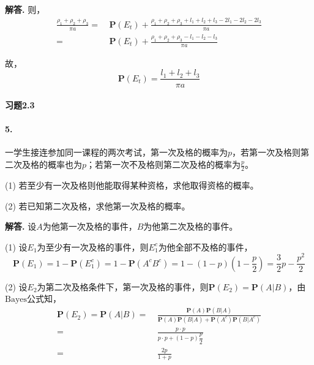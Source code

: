 \documentclass[12pt, a4paper, oneside]{ctexart}
\newenvironment{solution}{\par\noindent\textbf{解答. }}{\bigskip\par}
\begin{document}
\begin{solution}
    则，
    \begin{equation*}
        \begin{aligned}
            \frac{\rho_1+\rho_2+\rho_3}{\pi a} =&\ \textbf{P}(E_t)+\frac{\rho_1+\rho_2+\rho_3+l_1+l_2+l_3-2l_1-2l_2-2l_3}{\pi a}\\
            =&\ \textbf{P}(E_t)+\frac{\rho_1+\rho_2+\rho_3-l_1-l_2-l_3}{\pi a}
        \end{aligned}
    \end{equation*}

    故，
    \begin{equation*}
        \textbf{P}(E_t) = \frac{l_1+l_2+l_3}{\pi a}
    \end{equation*}
\end{solution}
\paragraph{习题2.3}
\paragraph{5.}一学生接连参加同一课程的两次考试，第一次及格的概率为$p$，若第一次及格则第二次及格的概率也为$p$；若第一次不及格则第二次及格的概率为$\frac{p}{2}$。

(1) 若至少有一次及格则他能取得某种资格，求他取得资格的概率。

(2) 若已知第二次及格，求他第一次及格的概率。

\begin{solution}
    设$A$为他第一次及格的事件，$B$为他第二次及格的事件。

    (1) 设$E_1$为至少有一次及格的事件，则$E_1^c$为他全部不及格的事件，
    \begin{equation*}
        \textbf{P}(E_1) = 1-\textbf{P}(E_1^c) = 1-\textbf{P}(A^cB^c) = 1-(1-p)(1-\frac{p}{2}) = \frac{3}{2}p-\frac{p^2}{2}
    \end{equation*}

    (2) 设$E_2$为第二次及格条件下，第一次及格的事件，则$\textbf{P}(E_2) = \textbf{P}(A|B)$，由$\text{Bayes公式}$知，
    \begin{equation*}
        \begin{aligned}
            \textbf{P}(E_2) = \textbf{P}(A|B) =&\ \frac{\textbf{P}(A)\textbf{P}(B|A)}{\textbf{P}(A)\textbf{P}(B|A)+\textbf{P}(A^c)\textbf{P}(B|A^c)}\\
            =&\ \frac{p\cdot p}{p\cdot p+(1-p)\dfrac{p}{2}}\\
            =&\ \frac{2p}{1+p}
        \end{aligned}
    \end{equation*}
\end{solution}
\end{document}
